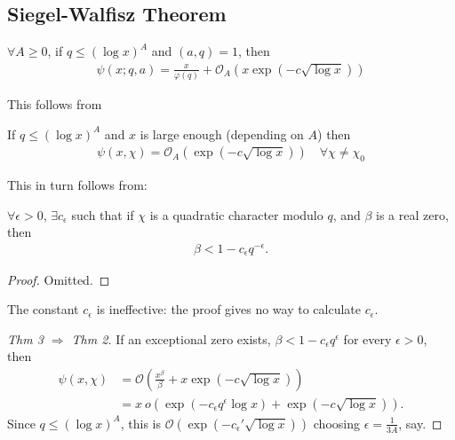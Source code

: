 \documentclass{article}
\newcommand{\1}{\mathbbm{1}}
\newcommand{\bigO}{\mathcal{O}}
\begin{document}
\subsection{Siegel-Walfisz Theorem}
\begin{thm}
  $\forall A \geq 0$, if $q \leq (\log x)^A$ and $(a,q) = 1$, then
  \begin{align*}
    \psi(x;q,a) = \frac{x}{\varphi(q)} + \bigO_A(x \exp(-c \sqrt{\log x}))
  \end{align*}
\end{thm}
This follows from
\begin{thm}
  If $q \leq (\log x)^A$ and $x$ is large enough (depending on $A$) then
  \begin{align*}
    \psi(x,\chi) = \bigO_A(\exp(-c \sqrt{\log x})) \quad \forall \chi \neq \chi_0
  \end{align*}
\end{thm}
This in turn follows from:
\begin{thm}[Siegel]
  $\forall \epsilon > 0$, $\exists c_\epsilon$ such that if $\chi$ is a quadratic character modulo $q$, and $\beta$ is a real zero, then
  \begin{align*}
    \beta < 1 - c_\epsilon q^{-\epsilon}.
  \end{align*}
\end{thm}
\begin{proof}
  Omitted.
\end{proof}
The constant $c_\epsilon$ is ineffective: the proof gives no way to calculate $c_\epsilon$.
\begin{proof}[Thm 3 $\Rightarrow$ Thm 2]
  If an exceptional zero exists, $\beta < 1 - c_\epsilon q^\epsilon$ for every $\epsilon > 0$, then
  \begin{align*}
    \psi(x,\chi) &= \bigO\left(\frac{x^\beta}{\beta} + x \exp(-c \sqrt{\log x})\right) \\
                 &= x\ o\!\left(\exp(-c_\epsilon q^\epsilon \log x) + \exp(-c \sqrt{\log x})\right).
  \end{align*}
  Since $q \leq (\log x)^A$, this is $\bigO(\exp(-c_\epsilon' \sqrt{\log x}))$ choosing $\epsilon = \frac{1}{3A}$, say.
\end{proof}

\clearpage
\printnomenclature
\printindex
\end{document}
